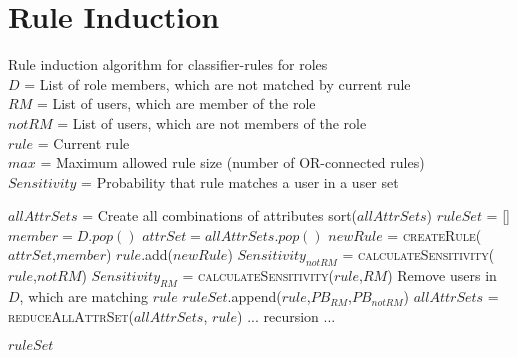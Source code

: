 \section{Rule Induction}
\label{sec:A_ruleInduction}
	\begin{algorithm}
		\small
		\caption{Rule induction algorithm for classifier-rules for roles\protect\\
			$D$ = List of role members, which are not matched by current rule\protect\\
			$RM$ = List of users, which are member of the role\protect\\
			$notRM$ = List of users, which are not members of the role\protect\\
			$rule$ = Current rule\protect\\
			$max$ = Maximum allowed rule size (number of OR-connected rules)\protect\\
			$Sensitivity$ = Probability that rule matches a user in a user set}
		\label{alg:ruleInduction}
		\begin{algorithmic}[1]
			\State $allAttrSets$ = Create all combinations of attributes
			\State sort($allAttrSets$)
			\State $ruleSet$ = []
			\State $member = D.pop()$
			\State $attrSet = allAttrSets.pop()$
			\State $newRule$ = \textsc{createRule}($attrSet$,$member$)
			\State $rule$.add($newRule$)
			\State $Sensitivity_{notRM}$ = \textsc{calculateSensitivity}($rule$,$notRM$)
			\State $Sensitivity_{RM}$ = \textsc{calculateSensitivity}($rule$,$RM$)
			\State Remove users in $D$, which are matching $rule$
			\State $ruleSet$.append($rule$,$PB_{RM}$,$PB_{notRM}$)
			\State $allAttrSets$ = \textsc{reduceAllAttrSet}($allAttrSets$, $rule$)
			\EndIf
			\Else
			\State ... recursion ...
			\iffalse
			\State $extendedRules$ = ruleInduction($D$,$RM$,$notRM$,$rule$,$max$)
			\For {$extendedRule$ in $extendedRules$}
			\State $ruleSet$.append($extendedRule$)
			\If{ $PB_{RM} == 1$ AND $PB_{notRM} == 0$}
			\State $allAttrSets$=\textsc{reduceAllAttrSet}($allAttrSets$, $rule$)
			\EndIf
			\EndFor
			\fi
			\EndIf
			\EndIf
			\EndIf
			\EndWhile 
			\EndWhile
			\State \Return $ruleSet$
			\EndProcedure
		\end{algorithmic}
	\end{algorithm}
